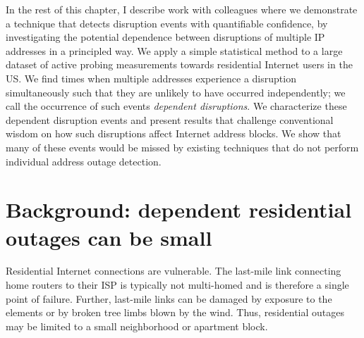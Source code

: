 In the rest of this chapter, I describe work with colleagues where we
demonstrate a technique that detects disruption events with
quantifiable confidence, by investigating the potential dependence
between disruptions of multiple IP addresses in a principled way. We
apply a simple statistical method to a large dataset of active probing
measurements towards residential Internet users in the US. We find
times when multiple addresses experience a disruption simultaneously
such that they are unlikely to have occurred independently; we call
the occurrence of such events \emph{dependent disruptions}. We
characterize these dependent disruption events and present results
that challenge conventional wisdom on how such disruptions affect
Internet address blocks. We show that many of these events would be
missed by existing techniques that do not perform individual address
outage detection.


\section{Background: dependent residential outages can be small}

Residential Internet connections are vulnerable. The last-mile link
connecting home routers to their ISP is typically not multi-homed and
is therefore a single point of failure. Further, last-mile links can
be damaged by exposure to the elements or by broken tree limbs blown
by the wind. Thus, residential outages may be limited to a small
neighborhood or apartment block.

